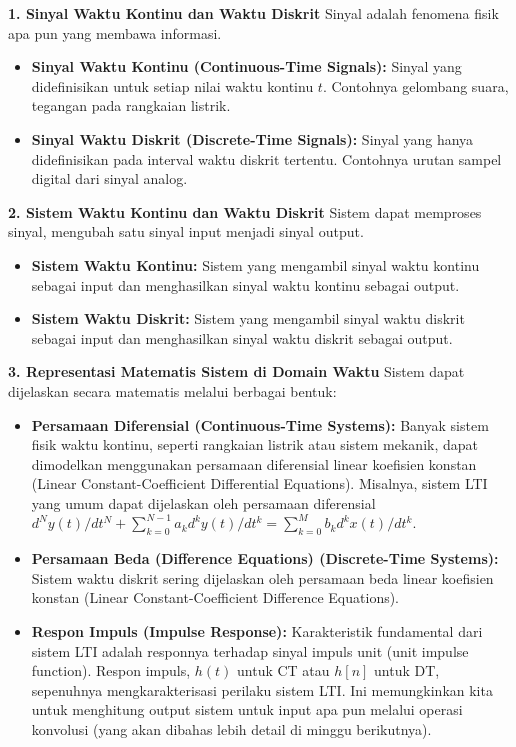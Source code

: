 \documentclass[
  letterpaper,
  DIV=11,
  numbers=noendperiod]{scrreprt}
\providecommand{\tightlist}{%
  \setlength{\itemsep}{0pt}\setlength{\parskip}{0pt}}
\begin{document}
\textbf{1. Sinyal Waktu Kontinu dan Waktu Diskrit} Sinyal adalah
fenomena fisik apa pun yang membawa informasi.

\begin{itemize}
\tightlist
\item
  \textbf{Sinyal Waktu Kontinu (Continuous-Time Signals):} Sinyal yang
  didefinisikan untuk setiap nilai waktu kontinu \(t\). Contohnya
  gelombang suara, tegangan pada rangkaian listrik.
\item
  \textbf{Sinyal Waktu Diskrit (Discrete-Time Signals):} Sinyal yang
  hanya didefinisikan pada interval waktu diskrit tertentu. Contohnya
  urutan sampel digital dari sinyal analog.
\end{itemize}

\textbf{2. Sistem Waktu Kontinu dan Waktu Diskrit} Sistem dapat
memproses sinyal, mengubah satu sinyal input menjadi sinyal output.

\begin{itemize}
\tightlist
\item
  \textbf{Sistem Waktu Kontinu:} Sistem yang mengambil sinyal waktu
  kontinu sebagai input dan menghasilkan sinyal waktu kontinu sebagai
  output.
\item
  \textbf{Sistem Waktu Diskrit:} Sistem yang mengambil sinyal waktu
  diskrit sebagai input dan menghasilkan sinyal waktu diskrit sebagai
  output.
\end{itemize}

\textbf{3. Representasi Matematis Sistem di Domain Waktu} Sistem dapat
dijelaskan secara matematis melalui berbagai bentuk:

\begin{itemize}
\tightlist
\item
  \textbf{Persamaan Diferensial (Continuous-Time Systems):} Banyak
  sistem fisik waktu kontinu, seperti rangkaian listrik atau sistem
  mekanik, dapat dimodelkan menggunakan persamaan diferensial linear
  koefisien konstan (Linear Constant-Coefficient Differential
  Equations). Misalnya, sistem LTI yang umum dapat dijelaskan oleh
  persamaan diferensial
  \(d^Ny(t)/dt^N + \sum_{k=0}^{N-1} a_k d^ky(t)/dt^k = \sum_{k=0}^{M} b_k d^kx(t)/dt^k\).
\item
  \textbf{Persamaan Beda (Difference Equations) (Discrete-Time
  Systems):} Sistem waktu diskrit sering dijelaskan oleh persamaan beda
  linear koefisien konstan (Linear Constant-Coefficient Difference
  Equations).
\item
  \textbf{Respon Impuls (Impulse Response):} Karakteristik fundamental
  dari sistem LTI adalah responnya terhadap sinyal impuls unit (unit
  impulse function). Respon impuls, \(h(t)\) untuk CT atau \(h[n]\)
  untuk DT, sepenuhnya mengkarakterisasi perilaku sistem LTI. Ini
  memungkinkan kita untuk menghitung output sistem untuk input apa pun
  melalui operasi konvolusi (yang akan dibahas lebih detail di minggu
  berikutnya).
\end{itemize}
\end{document}
